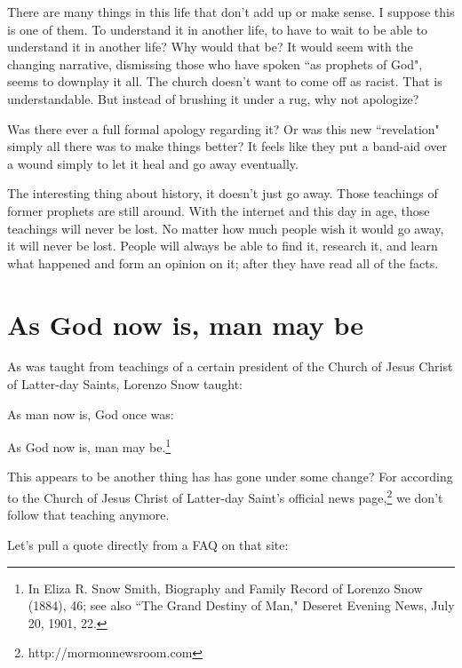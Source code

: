 \documentclass{article}
\begin{document}
There are many things in this life that don't add up or make sense. I suppose
this is one of them. To understand it in another life, to have to wait to be 
able to understand it in another life? Why would that be? It would seem with
the changing narrative, dismissing those who have spoken ``as prophets of God",
seems to downplay it all. The church doesn't want to come off as racist. That
is understandable. But instead of brushing it under a rug, why not apologize?

Was there ever a full formal apology regarding it? Or was this new ``revelation"
simply all there was to make things better? It feels like they put a band-aid
over a wound simply to let it heal and go away eventually.

The interesting thing about history, it doesn't just go away. Those teachings
of former prophets are still around. With the internet and this day in age,
those teachings will never be lost. No matter how much people wish it would go
away, it will never be lost. People will always be able to find it, research it,
and learn what happened and form an opinion on it; after they have read all of
the facts.

\newpage

\section{As God now is, man may be}

As was taught from teachings of a certain president of the Church of Jesus
Christ of Latter-day Saints, Lorenzo Snow taught:

\begin{displayquote}
As man now is, God once was:

As God now is, man may be.\footnote{In Eliza R. Snow Smith, Biography and 
Family Record of Lorenzo Snow (1884), 46; see also ``The Grand Destiny of Man," 
Deseret Evening News, July 20, 1901, 22.}
\end{displayquote}

This appears to be another thing has has gone under some change? For according
to the Church of Jesus Christ of Latter-day Saint's official news 
page,\footnote{http://mormonnewsroom.com} we don't follow that teaching anymore.

Let's pull a quote directly from a FAQ on that site:
\end{document}

